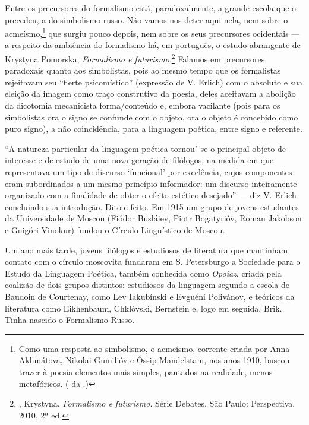 Entre os precursores do formalismo está, paradoxalmente, a grande escola
que o precedeu, a do simbolismo russo. Não vamos nos deter aqui nela, nem sobre o acmeísmo,\footnote{Como uma resposta ao simbolismo, 
o acmeísmo, corrente criada por Anna Akhmátova, Nikolai Gumilióv e 
Óssip Mandelstam, nos anos 1910, buscou trazer à poesia elementos mais
 simples, pautados na realidade, menos metafóricos. ( da 
.)} que surgiu pouco depois, nem sobre os seus
precursores ocidentais --- a respeito da ambiência do formalismo há, em
português, o estudo abrangente de Krystyna Pomorska, \emph{Formalismo e
futurismo}.\footnote{, Krystyna. \emph{Formalismo
 e futurismo}. Série Debates. São Paulo: Perspectiva, 2010, 2ª ed.} Falamos em precursores paradoxais quanto aos simbolistas,
pois ao mesmo tempo que os formalistas rejeitavam seu ``flerte
psicomístico'' (expressão de V. Erlich) com o absoluto e sua eleição da
imagem como traço construtivo da poesia, deles aceitavam a abolição da
dicotomia mecanicista forma/conteúdo e, embora vacilante (pois para os
simbolistas ora o signo se confunde com o objeto, ora o objeto é
concebido como puro signo), a não coincidência, para a linguagem
poética, entre signo e referente.

``A natureza particular da linguagem poética tornou"-se o principal
objeto de interesse e de estudo de uma nova geração de filólogos, na
medida em que representava um tipo de discurso `funcional' por
excelência, cujos componentes eram subordinados a um mesmo princípio
informador: um discurso inteiramente organizado com a finalidade de
obter o efeito estético desejado'' --- diz V. Erlich concluindo sua
introdução. Dito e feito. Em 1915 um grupo de jovens estudantes da
Universidade de Moscou (Fiódor Busláiev, Piotr Bogatyrióv, Roman Jakobson e Guigóri
Vinokur) fundou o Círculo Linguístico de Moscou.

Um ano mais tarde, jovens filólogos e estudiosos de literatura que
mantinham contato com o círculo moscovita fundaram em S. Petersburgo a
Sociedade para o Estudo da Linguagem Poética, também conhecida como
\emph{Opoiaz}, criada pela coalizão de dois grupos distintos: estudiosos
da linguagem segundo a escola de Baudoin de Courtenay, como Lev Iakubínski
e Evguéni Polivánov, e teóricos da literatura como Eikhenbaum, Chklóvski, Bernstein e, logo em seguida, Brik. Tinha
nascido o Formalismo Russo.

